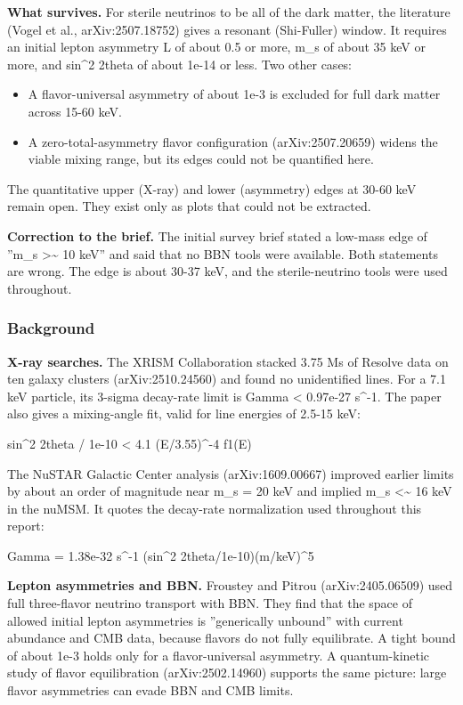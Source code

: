 \documentclass[11pt,a4paper]{article}
\begin{document}
\textbf{What survives.} For sterile neutrinos to be all of the dark matter, the literature (Vogel et al., arXiv:2507.18752) gives a resonant (Shi-Fuller) window. It requires an initial lepton asymmetry L of about 0.5 or more, m\_s of about 35 keV or more, and sin\textasciicircum{}2 2theta of about 1e-14 or less. Two other cases:

\begin{itemize}
  \item A flavor-universal asymmetry of about 1e-3 is excluded for full dark matter across 15-60 keV.
  \item A zero-total-asymmetry flavor configuration (arXiv:2507.20659) widens the viable mixing range, but its edges could not be quantified here.
\end{itemize}
The quantitative upper (X-ray) and lower (asymmetry) edges at 30-60 keV remain open. They exist only as plots that could not be extracted.

\textbf{Correction to the brief.} The initial survey brief stated a low-mass edge of ''m\_s \textgreater{}\textasciitilde{} 10 keV'' and said that no BBN tools were available. Both statements are wrong. The edge is about 30-37 keV, and the sterile-neutrino tools were used throughout.

\subsubsection*{Background}
\textbf{X-ray searches.} The XRISM Collaboration stacked 3.75 Ms of Resolve data on ten galaxy clusters (arXiv:2510.24560) and found no unidentified lines. For a 7.1 keV particle, its 3-sigma decay-rate limit is Gamma \textless{} 0.97e-27 s\textasciicircum{}-1. The paper also gives a mixing-angle fit, valid for line energies of 2.5-15 keV:

sin\textasciicircum{}2 2theta / 1e-10 \textless{} 4.1 (E/3.55)\textasciicircum{}-4 f1(E)

The NuSTAR Galactic Center analysis (arXiv:1609.00667) improved earlier limits by about an order of magnitude near m\_s = 20 keV and implied m\_s \textless{}\textasciitilde{} 16 keV in the nuMSM. It quotes the decay-rate normalization used throughout this report:

Gamma = 1.38e-32 s\textasciicircum{}-1 (sin\textasciicircum{}2 2theta/1e-10)(m/keV)\textasciicircum{}5

\textbf{Lepton asymmetries and BBN.} Froustey and Pitrou (arXiv:2405.06509) used full three-flavor neutrino transport with BBN. They find that the space of allowed initial lepton asymmetries is ''generically unbound'' with current abundance and CMB data, because flavors do not fully equilibrate. A tight bound of about 1e-3 holds only for a flavor-universal asymmetry. A quantum-kinetic study of flavor equilibration (arXiv:2502.14960) supports the same picture: large flavor asymmetries can evade BBN and CMB limits.
\end{document}
